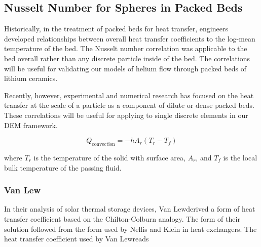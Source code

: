 \subsection{Nusselt Number for Spheres in Packed Beds}\label{sec:particle-convection}

Historically, in the treatment of packed beds for heat transfer, engineers developed relationships between overall heat transfer coefficients to the log-mean temperature of the bed. The Nusselt number correlation was applicable to the bed overall rather than any discrete particle inside of the bed. The correlations will be useful for validating our models of helium flow through packed beds of lithium ceramics.


Recently, however, experimental and numerical research has focused on the heat transfer at the scale of a particle as a component of dilute or dense packed beds. These correlations will be useful for applying to single discrete elements in our DEM framework.

\begin{equation}
	Q_\text{convection} = -hA_r(T_r-T_f)
\end{equation}

where $T_r$ is the temperature of the solid with surface area, $A_r$, and $T_f$ is the local bulk temperature of the passing fluid.

\subsubsection{Van Lew }

In their analysis of solar thermal storage devices, Van Lew\etal derived a form of heat transfer coefficient based on the Chilton-Colburn analogy.\cite{vanlew133} The form of their solution followed from the form used by Nellis and Klein \cite{Nellis2009} in heat exchangers. The heat transfer coefficient used by Van Lew\etal reads


